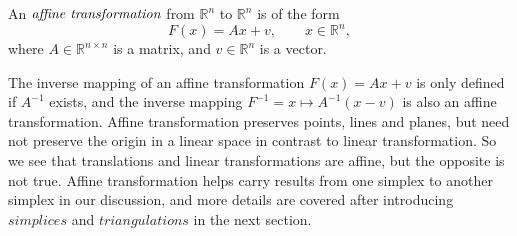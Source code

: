       \begin{definition*}
      An $\emph{affine transformation}$ from $\mathbb{R}^n$ to $\mathbb{R}^n$ is of the form
      \begin{equation*}
      {F}(x) = {Ax} + {v}, \qquad {x}\in\mathbb{R}^n,
      \end{equation*}
      where ${A}\in\mathbb{R}^{n\times n}$ is a matrix, and  ${v}\in\mathbb{R}^n$ is a vector.
      \end{definition*}
      The inverse mapping of an affine transformation $F(x) = Ax + v$ is only defined if $A^{-1}$ exists, and the inverse mapping $F^{-1} = {x} \mapsto {A}^{-1}({x} - {v})$ is also an affine transformation.
      Affine transformation preserves points, lines and planes, but need not preserve the origin in a linear space in contrast to linear transformation. So we see that translations and linear transformations are affine, but the opposite is not true. Affine transformation helps carry results from one simplex to another simplex in our discussion, and more details are covered after introducing $simplices$ and $triangulations$ in the next section.


